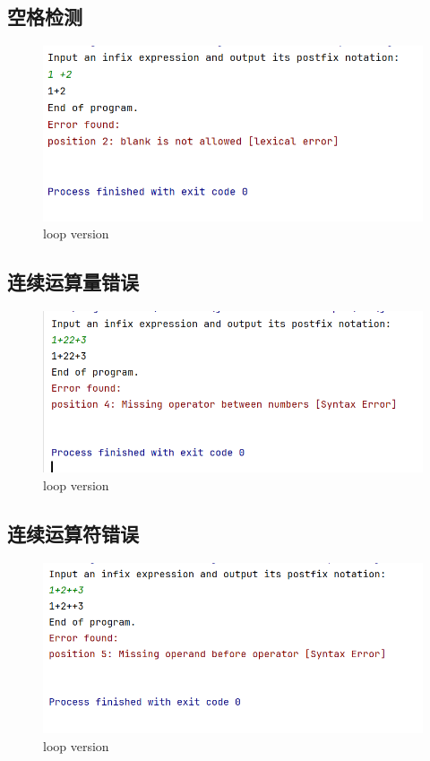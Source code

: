 \documentclass{article}
\begin{document}
\subsection{空格检测}
\begin{figure}[H]
    \includegraphics[width=\textwidth]{element/8.png}
    \caption{loop version}
\end{figure}
\subsection{连续运算量错误}
\begin{figure}[H]
    \includegraphics[width=\textwidth]{element/9.png}
    \caption{loop version}
\end{figure}
\subsection{连续运算符错误}
\begin{figure}[H]
    \includegraphics[width=\textwidth]{element/10.png}
    \caption{loop version}
\end{figure}
\end{document}
